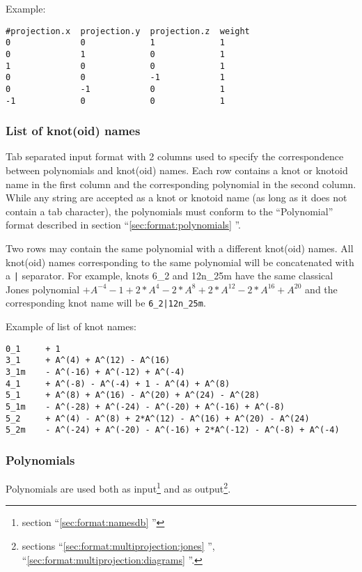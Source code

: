 Example:
\begin{lstlisting}
#projection.x  projection.y  projection.z  weight
0              0             1             1
0              1             0             1
1              0             0             1
0              0             -1            1
0              -1            0             1
-1             0             0             1
\end{lstlisting}



\subsubsection{\label{sec:format:namesdb}List of knot(oid) names}
Tab separated input format with 2 columns used to specify the correspondence between polynomials and knot(oid) names. Each row contains a knot or knotoid name in the first column and the corresponding polynomial in the second column.
While any string are accepted as a knot or knotoid name (as long as it does not contain a tab character), the polynomials must conform to the ``Polynomial'' format described in  section ``\ref{sec:format:polynomials} ''.

Two rows may contain the same polynomial with a different knot(oid) names. All knot(oid) names corresponding to the same polynomial will be concatenated  with a \lstinline{|} separator. For example, knots 6\_2 and 12n\_25m have the same classical Jones polynomial $+ A^{-4} - 1 + 2*A^{4} - 2*A^{8} + 2*A^{12} - 2*A^{16} + A^{20}$ and the  corresponding knot name will be \lstinline{6_2|12n_25m}.


Example of list of knot names:
\begin{lstlisting}
0_1     + 1
3_1     + A^(4) + A^(12) - A^(16)
3_1m    - A^(-16) + A^(-12) + A^(-4)
4_1     + A^(-8) - A^(-4) + 1 - A^(4) + A^(8)
5_1     + A^(8) + A^(16) - A^(20) + A^(24) - A^(28)
5_1m    - A^(-28) + A^(-24) - A^(-20) + A^(-16) + A^(-8)
5_2     + A^(4) - A^(8) + 2*A^(12) - A^(16) + A^(20) - A^(24)
5_2m    - A^(-24) + A^(-20) - A^(-16) + 2*A^(-12) - A^(-8) + A^(-4)
\end{lstlisting}



\subsubsection{\label{sec:format:polynomials}Polynomials}
Polynomials are used both as input\footnote{section ``\ref{sec:format:namesdb} ''} and as output\footnote{sections ``\ref{sec:format:multiprojection:jones} '', ``\ref{sec:format:multiprojection:diagrams} ''.}.

